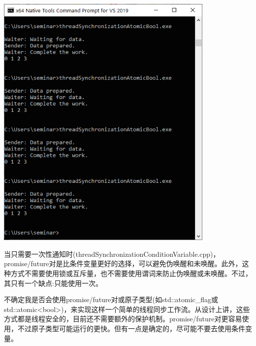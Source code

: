 \begin{center}
\includegraphics[width=0.8\textwidth]{content/3/chapter6/images/14.png}\\
\end{center}

\begin{tcolorbox}[breakable,enhanced jigsaw,colback=blue!5!white,colframe=blue!75!black,title={条件变量、promise/future对和std::atomic\_flag}]
	
当只需要一次性通知时(threadSynchronizationConditionVariable.cpp)，promise/future对是比条件变量更好的选择，可以避免伪唤醒和未唤醒。此外，这种方式不需要使用锁或互斥量，也不需要使用谓词来防止伪唤醒或未唤醒。不过，其只有一个缺点:只能使用一次。

不确定我是否会使用promise/future对或原子类型(如std::atomic\_flag或std::atomic<bool>)，来实现这样一个简单的线程同步工作流。从设计上讲，这些方式都是线程安全的，目前还不需要额外的保护机制。promise/future对更容易使用，不过原子类型可能运行的更快。但有一点是确定的，尽可能不要去使用条件变量。
	
\end{tcolorbox}



